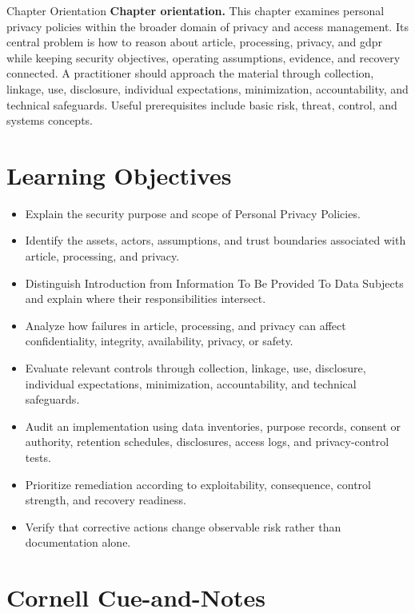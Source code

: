 \documentclass[11pt,letterpaper]{article}
\title{\CornellDocumentTitle}
\author{}
\date{}
\begin{document}
\maketitle
\begin{CornellOverviewBox}{Chapter Orientation}
\textbf{Chapter orientation.} This chapter examines personal privacy policies within the broader domain of privacy and access management. Its central problem is how to reason about article, processing, privacy, and gdpr while keeping security objectives, operating assumptions, evidence, and recovery connected. A practitioner should approach the material through collection, linkage, use, disclosure, individual expectations, minimization, accountability, and technical safeguards. Useful prerequisites include basic risk, threat, control, and systems concepts.
\end{CornellOverviewBox}
\section*{Learning Objectives}
\begin{itemize}
\item Explain the security purpose and scope of Personal Privacy Policies.
\item Identify the assets, actors, assumptions, and trust boundaries associated with article, processing, and privacy.
\item Distinguish Introduction from Information To Be Provided To Data Subjects and explain where their responsibilities intersect.
\item Analyze how failures in article, processing, and privacy can affect confidentiality, integrity, availability, privacy, or safety.
\item Evaluate relevant controls through collection, linkage, use, disclosure, individual expectations, minimization, accountability, and technical safeguards.
\item Audit an implementation using data inventories, purpose records, consent or authority, retention schedules, disclosures, access logs, and privacy-control tests.
\item Prioritize remediation according to exploitability, consequence, control strength, and recovery readiness.
\item Verify that corrective actions change observable risk rather than documentation alone.
\end{itemize}
\section*{Cornell Cue-and-Notes}
\end{document}
